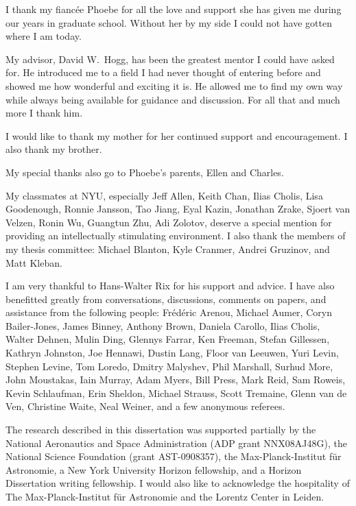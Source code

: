 I thank my fianc\'{e}e Phoebe for all the love and support she has
given me during our years in graduate school. Without her by my side I
could not have gotten where I am today.

My advisor, David W.~Hogg, has been the greatest mentor I could have
asked for. He introduced me to a field I had never thought of entering
before and showed me how wonderful and exciting it is. He allowed me
to find my own way while always being available for guidance and
discussion. For all that and much more I thank him.

I would like to thank my mother for her continued support and
encouragement. I also thank my brother.

My special thanks also go to Phoebe's parents, Ellen and Charles.

My classmates at NYU, especially Jeff Allen, Keith Chan, Ilias Cholis,
Lisa Goodenough, Ronnie Jansson, Tao Jiang, Eyal Kazin, Jonathan
Zrake, Sjoert van Velzen, Ronin Wu, Guangtun Zhu, Adi Zolotov, deserve
a special mention for providing an intellectually stimulating
environment. I also thank the members of my thesis committee: Michael
Blanton, Kyle Cranmer, Andrei Gruzinov, and Matt Kleban.

I am very thankful to Hans-Walter Rix for his support and advice. I
have also benefitted greatly from conversations, discussions, comments
on papers, and assistance from the following people: Fr{\'e}d{\'e}ric
Arenou, Michael Aumer, Coryn Bailer-Jones, James Binney, Anthony
Brown, Daniela Carollo, Ilias Cholis, Walter Dehnen, Mulin Ding,
Glennys Farrar, Ken Freeman, Stefan Gillessen, Kathryn Johnston, Joe
Hennawi, Dustin Lang, Floor van Leeuwen, Yuri Levin, Stephen Levine,
Tom Loredo, Dmitry Malyshev, Phil Marshall, Surhud More, John
Moustakas, Iain Murray, Adam Myers, Bill Press, Mark Reid, Sam Roweis,
Kevin Schlaufman, Erin Sheldon, Michael Strauss, Scott Tremaine, Glenn
van de Ven, Christine Waite, Neal Weiner, and a few anonymous
referees.

The research described in this dissertation was supported partially by
the National Aeronautics and Space Administration (ADP grant
NNX08AJ48G), the National Science Foundation (grant AST-0908357), the
Max-Planck-Institut f\"ur Astronomie, a New York University Horizon
fellowship, and a Horizon Dissertation writing fellowship. I would
also like to acknowledge the hospitality of The Max-Planck-Institut
f\"ur Astronomie and the Lorentz Center in Leiden.




